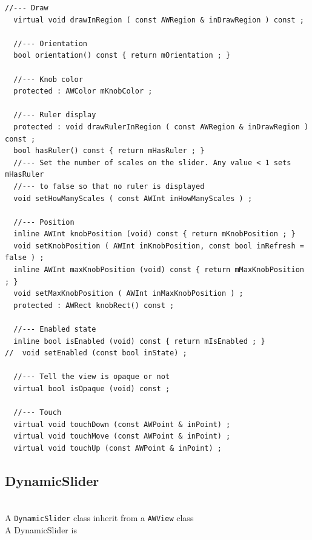 \documentclass[a4paper,11pt]{extarticle}
\begin{document}
\begin{lstlisting}[language=Arduinonl]
  //--- Draw
  virtual void drawInRegion ( const AWRegion & inDrawRegion ) const ;
   
  //--- Orientation
  bool orientation() const { return mOrientation ; }
  
  //--- Knob color
  protected : AWColor mKnobColor ;
  
  //--- Ruler display
  protected : void drawRulerInRegion ( const AWRegion & inDrawRegion ) const ;
  bool hasRuler() const { return mHasRuler ; }
  //--- Set the number of scales on the slider. Any value < 1 sets mHasRuler
  //--- to false so that no ruler is displayed
  void setHowManyScales ( const AWInt inHowManyScales ) ;
  
  //--- Position
  inline AWInt knobPosition (void) const { return mKnobPosition ; }
  void setKnobPosition ( AWInt inKnobPosition, const bool inRefresh = false ) ;
  inline AWInt maxKnobPosition (void) const { return mMaxKnobPosition ; }
  void setMaxKnobPosition ( AWInt inMaxKnobPosition ) ;
  protected : AWRect knobRect() const ;
  
  //--- Enabled state
  inline bool isEnabled (void) const { return mIsEnabled ; }
//  void setEnabled (const bool inState) ;
  
  //--- Tell the view is opaque or not
  virtual bool isOpaque (void) const ;
  
  //--- Touch
  virtual void touchDown (const AWPoint & inPoint) ;
  virtual void touchMove (const AWPoint & inPoint) ;
  virtual void touchUp (const AWPoint & inPoint) ;
\end{lstlisting}


\newpage
\subsection{DynamicSlider}

~\\ A \texttt{DynamicSlider} class inherit from a \texttt{AWView} class
~\\ A DynamicSlider is 
~\\
~\\
\end{document}
